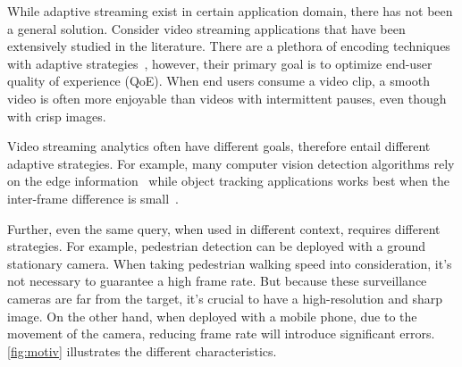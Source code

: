 While adaptive streaming exist in certain application domain, there has not been
a general solution. Consider video streaming applications that have been
extensively studied in the literature. There are a plethora of encoding
techniques~\cite{richardson2011h, grange2016vp9} with adaptive
strategies~\cite{yin2015control, michalos2012dynamic, pantos2016http}, however,
their primary goal is to optimize end-user quality of experience (QoE).  When
end users consume a video clip, a smooth video is often more enjoyable than
videos with intermittent pauses, even though with crisp images.

Video streaming analytics often have different goals, therefore entail different
adaptive strategies. For example, many computer vision detection algorithms rely
on the edge information~\cite{canny1986computational, lowe2004distinctive,
  viola2001rapid} while object tracking applications works best when the
inter-frame difference is small~\cite{allen2004object}.

Further, even the same query, when used in different context, requires different
strategies. For example, pedestrian detection can be deployed with a ground
stationary camera. When taking pedestrian walking speed into consideration, it's
not necessary to guarantee a high frame rate. But because these surveillance
cameras are far from the target, it's crucial to have a high-resolution and
sharp image. On the other hand, when deployed with a mobile phone, due to the
movement of the camera, reducing frame rate will introduce significant
errors. \autoref{fig:motiv} illustrates the different characteristics.

